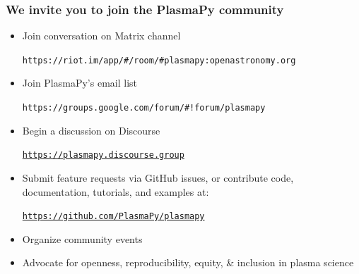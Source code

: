 \documentclass[default,compress]{beamer}
\begin{document}
\begin{frame}[plain]
    \frametitle{We invite you to join the PlasmaPy community}
    \begin{itemize}
    \item Join conversation on Matrix channel
        \begin{center}
            \small{\texttt{https://riot.im/app/\#/room/\#plasmapy:openastronomy.org}}
        \end{center}
    \item Join PlasmaPy's email list
        \begin{center}
                \small{\texttt{https://groups.google.com/forum/\#!forum/plasmapy}}
        \end{center}
    \item Begin a discussion on Discourse
        \begin{center}
            \href{
                    https://plasmapy.discourse.group/
                }{
                \small{\texttt{https://plasmapy.discourse.group}}}
        \end{center}
    \item Submit feature requests via GitHub issues, or contribute code, documentation, tutorials, and examples at:
        \begin{center}
            \href{
                https://github.com/PlasmaPy/plasmapy
            }{
                \small{\texttt{https://github.com/PlasmaPy/plasmapy}}
            }
        \end{center}
    \item Organize community events
    \item Advocate for openness, reproducibility, equity, \& inclusion in plasma science
    \end{itemize}
\end{frame}
\end{document}
